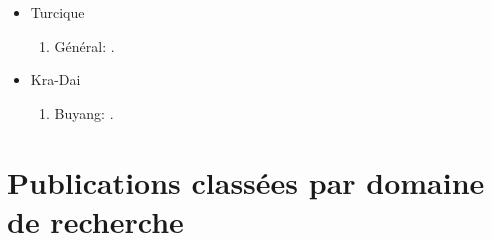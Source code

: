 \documentclass[oneside,a4paper,11pt]{article}
\newcommand{\zh}[1]{{\cn #1}}
\newcommand{\lingua}[3]{#2}%
\begin{document}
\begin{itemize}
\begin{enumerate}
\end{enumerate}
\item  \lingua{Turkic}{Turcique}{突厥语系}
\begin{enumerate}
\item \lingua{General}{Général}{总论}: \cite{antonov12kumush}.
\end{enumerate}
\item \lingua{Kra-Dai}{Kra-Dai}{侗台语系}
\begin{enumerate}
\item \lingua{Buyang}{Buyang}{布央语}: \cite{jacques17buyang}.
\end{enumerate}
\end{itemize}  

\section{\lingua{By topics}{Publications classées par domaine de recherche}{研究领域}}
\end{document}

